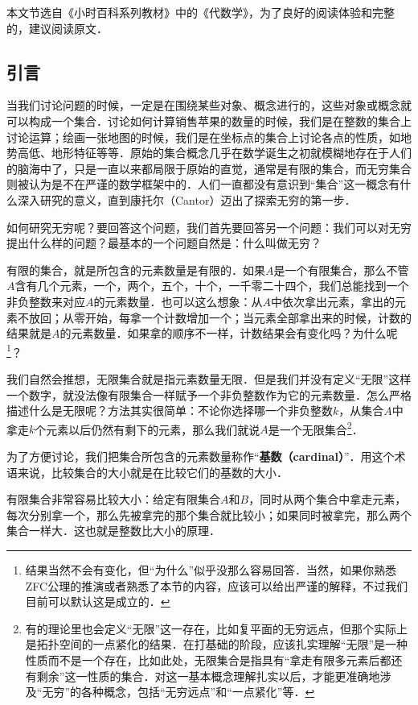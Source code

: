 
本文节选自《小时百科系列教材》中的《代数学》，为了良好的阅读体验和完整的，建议阅读原文．

\subsection{引言}

当我们讨论问题的时候，一定是在围绕某些对象、概念进行的，这些对象或概念就可以构成一个集合．讨论如何计算销售苹果的数量的时候，我们是在整数的集合上讨论运算；绘画一张地图的时候，我们是在坐标点的集合上讨论各点的性质，如地势高低、地形特征等等．原始的集合概念几乎在数学诞生之初就模糊地存在于人们的脑海中了，只是一直以来都局限于原始的直觉，通常是有限的集合，而无穷集合则被认为是不在严谨的数学框架中的．人们一直都没有意识到“集合”这一概念有什么深入研究的意义，直到康托尔（Cantor）迈出了探索无穷的第一步．

如何研究无穷呢？要回答这个问题，我们首先要回答另一个问题：我们可以对无穷提出什么样的问题？最基本的一个问题自然是：什么叫做无穷？

有限的集合，就是所包含的元素数量是有限的．如果$A$是一个有限集合，那么不管$A$含有几个元素，一个，两个，五个，十个，一千零二十四个，我们总能找到一个非负整数来对应$A$的元素数量．也可以这么想象：从$A$中依次拿出元素，拿出的元素不放回；从零开始，每拿一个计数增加一个；当元素全部拿出来的时候，计数的结果就是$A$的元素数量．如果拿的顺序不一样，计数结果会有变化吗？为什么呢\footnote{结果当然不会有变化，但“为什么”似乎没那么容易回答．当然，如果你熟悉ZFC公理的推演或者熟悉了本节的内容，应该可以给出严谨的解释，不过我们目前可以默认这是成立的．}？

我们自然会推想，无限集合就是指元素数量无限．但是我们并没有定义“无限”这样一个数字，就没法像有限集合一样赋予一个非负整数作为它的元素数量．怎么严格描述什么是无限呢？方法其实很简单：不论你选择哪一个非负整数$k$，从集合$A$中拿走$k$个元素以后仍然有剩下的元素，那么我们就说$A$是一个无限集合\footnote{有的理论里也会定义“无限”这一存在，比如复平面的无穷远点，但那个实际上是拓扑空间的一点紧化的结果．在打基础的阶段，应该扎实理解“无限”是一种性质而不是一个存在，比如此处，无限集合是指具有“拿走有限多元素后都还有剩余”这一性质的集合．对这一基本概念理解扎实以后，才能更准确地涉及“无穷”的各种概念，包括“无穷远点”和“一点紧化”等．}．

为了方便讨论，我们把集合所包含的元素数量称作“\textbf{基数（cardinal）}”．用这个术语来说，比较集合的大小就是在比较它们的基数的大小．

有限集合非常容易比较大小：给定有限集合$A$和$B$，同时从两个集合中拿走元素，每次分别拿一个，那么先被拿完的那个集合就比较小；如果同时被拿完，那么两个集合一样大．这也就是整数比大小的原理．

